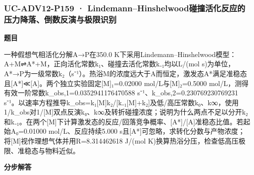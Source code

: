 \documentclass[UTF8,11pt,a4paper]{ctexart}
\begin{document}
\subsubsection*{UC-ADV12-P159 · Lindemann–Hinshelwood碰撞活化反应的压力降落、倒数反演与极限识别}
\noindent\textbf{题目}\par
一种假想气相活化分解A→P在350.0 K下采用Lindemann–Hinshelwood模型：A+M⇌A*+M，正向活化常数k₁、碰撞去活化常数k₋₁均以L/(mol s)为单位，A*→P为一级常数k₂（s⁻¹）。热浴M的浓度远大于A而恒定，激发态A*满足准稳态且[A*]≪[A]。两个独立实验固定[M]₁=0.02000 mol/L与[M]₂=0.5000 mol/L，测得有效一阶常数k\_obs,1=0.0352941176470588 s⁻¹、k\_obs,2=0.230769230769231 s⁻¹。以速率方程推导k\_obs=k₁[M]k₂/[k₋₁[M]+k₂]及低/高压常数k₀、k∞，使用1/k\_obs对1/[M]双点反演k₀、k∞及转折碰撞浓度；说明为什么两点不足以分开k₂和k₋₁。在两个[M]下计算激发态的反应/回落竞争概率、[A*]/[A]准稳态比值。若起始A₀=0.01000 mol/L、反应持续5.000 s且[A*]可忽略，求转化分数与产物浓度；将[M]视作理想气体并用R=8.314462618 J/(mol K)换算热浴分压，检查低高压极限、准稳态与物料近似。\par
\medskip\noindent\textbf{分步解答}
\end{document}
